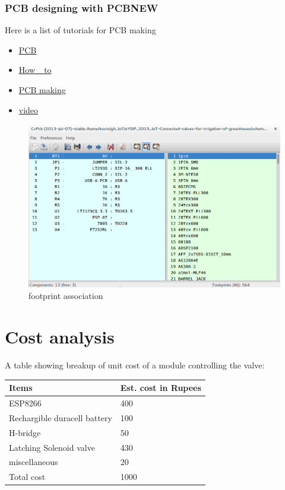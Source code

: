 \documentclass[16pt]{article}
\begin{document}
\subsubsection{PCB designing with
PCBNEW}
Here is a list of tutorials for PCB making


\begin{itemize}

\item
\href{http://store.curiousinventor.com/guides/kicad/pcb_layout/change_part/}{PCB}
\item
\href{http://kicadhowto.wikidot.com/}{How \_to}
\item
\href{http://store.curiousinventor.com/guides/kicad/pcb_layout/}{PCB
 making}
\item
\href{https://www.youtube.com/watch?v=TYqmmj6SO-k}{video}
\end{itemize}

\hfill 


\begin{figure}
\includegraphics[width=1\textwidth]{images/cvpcb.png}
\caption{footprint association}
\end{figure}

\vspace{10cm}



\section{Cost analysis}

A table showing breakup of unit cost of a module controlling the valve: 

\vspace{0.5cm}
\begin{tabular}{|m{5cm}|m{3.5cm}|}
	\hline
	{\bf Items} & {\bf Est. cost in Rupees}\\ \hline
	ESP8266 & 400 \\ \hline
	Rechargible duracell battery & 100 \\ \hline
	H-bridge & 50 \\ \hline 
	Latching Solenoid valve & 430 \\ \hline
	miscellaneous & 20 \\ \hline
	Total cost & 1000 \\ \hline 
\end{tabular} 
\end{document}
